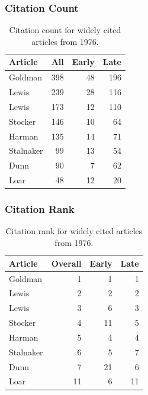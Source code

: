 \documentclass[
  10pt,
  letterpaper,
  DIV=11,
  numbers=noendperiod,
  twoside]{scrartcl}
\begin{document}
\subsubsection*{Citation Count}\label{sec-count-1976}

\begin{longtable}[]{@{}lrrr@{}}

\caption{\label{tbl-citation-count-1976}Citation count for widely cited
articles from 1976.}

\tabularnewline

\toprule\noalign{}
Article & All & Early & Late \\
\midrule\noalign{}
\endhead
\bottomrule\noalign{}
\endlastfoot
Goldman & 398 & 48 & 196 \\
Lewis & 239 & 28 & 116 \\
Lewis & 173 & 12 & 110 \\
Stocker & 146 & 10 & 64 \\
Harman & 135 & 14 & 71 \\
Stalnaker & 99 & 13 & 54 \\
Dunn & 90 & 7 & 62 \\
Loar & 48 & 12 & 20 \\

\end{longtable}

\subsubsection*{Citation Rank}\label{sec-rank-1976}

\begin{longtable}[]{@{}lrrr@{}}

\caption{\label{tbl-citation-rank-1976}Citation rank for widely cited
articles from 1976.}

\tabularnewline

\toprule\noalign{}
Article & Overall & Early & Late \\
\midrule\noalign{}
\endhead
\bottomrule\noalign{}
\endlastfoot
Goldman & 1 & 1 & 1 \\
Lewis & 2 & 2 & 2 \\
Lewis & 3 & 6 & 3 \\
Stocker & 4 & 11 & 5 \\
Harman & 5 & 4 & 4 \\
Stalnaker & 6 & 5 & 7 \\
Dunn & 7 & 21 & 6 \\
Loar & 11 & 6 & 11 \\

\end{longtable}
\end{document}
